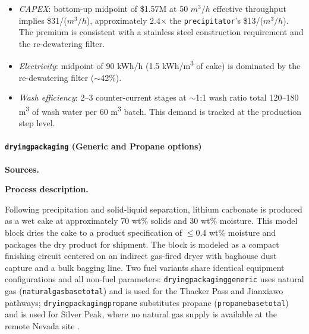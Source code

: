 \documentclass{article}
\renewcommand\_{\textunderscore\allowbreak}
\begin{document}
\begin{itemize}[noitemsep]
	\item \textit{CAPEX}: bottom-up midpoint of \$1.57M at 50 $\si{m^3/h}$ effective throughput implies \$31/($\si{m^3/h}$), approximately 2.4$\times$ the \texttt{precipitator}'s \$13/($\si{m^3/h}$). The premium is consistent with a stainless steel construction requirement and the re-dewatering filter.
	\item \textit{Electricity}: midpoint of 90 kWh/h (1.5 \si{kWh/m^3} of cake) is dominated by the re-dewatering filter ($\sim$42\%).
	\item \textit{Wash efficiency}: 2--3 counter-current stages at $\sim$1:1 wash ratio total 120--180 \si{m^3} of wash water per 60 \si{m^3} batch. This demand is tracked at the production step level.
\end{itemize}

\clearpage
\paragraph{\texttt{drying\_packaging} (Generic and Propane options)}\label{app:04-methods-blockdefs-drypack}\leavevmode\par

\medskip
\noindent\textbf{Sources.}\quad

\citet{laneNI43101Technical2024, sgscanadaincSK1300Technical2024, riordanFalchaniLithiumProject2024, samariMineralResourceEstimate2024, srkconsultingSECTechnicalReport2023a, daiEverBattClosedloopBattery2019}

\medskip
\noindent\textbf{Process description.}\quad

Following precipitation and solid-liquid separation, lithium carbonate is produced as a wet cake at approximately 70 wt\% solids and 30 wt\% moisture. This model block dries the cake to a product specification of $\leq$0.4 wt\% moisture and packages the dry product for shipment. The block is modeled as a compact finishing circuit centered on an indirect gas-fired dryer with baghouse dust capture and a bulk bagging line. Two fuel variants share identical equipment configurations and all non-fuel parameters: \texttt{drying\_packaging\_generic} uses natural gas (\texttt{natural\_gas\_base\_total}) and is used for the Thacker Pass and Jianxiawo pathways; \texttt{drying\_packaging\_propane} substitutes propane (\texttt{propane\_base\_total}) and is used for Silver Peak, where no natural gas supply is available at the remote Nevada site \cite{srkconsultingSECTechnicalReport2023a}.
\end{document}
